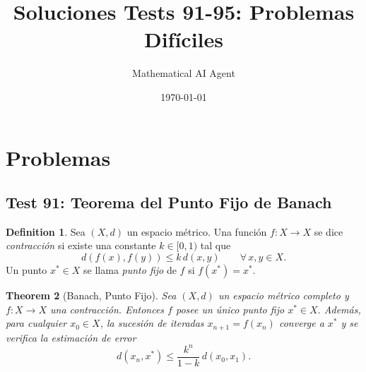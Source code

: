 \documentclass[11pt,a4paper]{article}
\title{Soluciones Tests 91-95: Problemas Difíciles}
\author{Mathematical AI Agent}
\date{\today}
\theoremstyle{plain}
\newtheorem{theorem}{Theorem}[section]
\theoremstyle{definition}
\newtheorem{definition}[theorem]{Definition}
\begin{document}
\maketitle

\section{Problemas}

\subsection*{Test 91: Teorema del Punto Fijo de Banach}

\begin{definition}
Sea $(X,d)$ un espacio métrico. Una función $f:X\to X$ se dice \emph{contracción} si existe una constante $k\in[0,1)$ tal que
\[
d(f(x),f(y))\le k\, d(x,y)\qquad\forall\,x,y\in X.
\]
Un punto $x^{*}\in X$ se llama \emph{punto fijo} de $f$ si $f(x^{*})=x^{*}$.
\end{definition}

\begin{theorem}[Banach, Punto Fijo]
Sea $(X,d)$ un espacio métrico completo y $f:X\to X$ una contracción. Entonces $f$ posee un único punto fijo $x^{*}\in X$. Además, para cualquier $x_{0}\in X$, la sucesión de iteradas $x_{n+1}=f(x_{n})$ converge a $x^{*}$ y se verifica la estimación de error
\[
d(x_{n},x^{*})\le \frac{k^{n}}{1-k}\,d(x_{0},x_{1}).
\]
\end{theorem}
\end{document}
